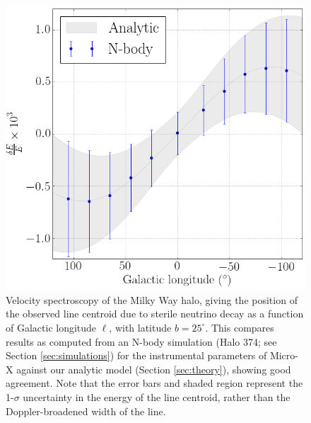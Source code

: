 \documentclass[aps,prl,10pt,twocolumn,superscriptaddress,showpacs]{revtex4-1}
\begin{document}
\begin{figure}[h!]
\centering
\includegraphics[width=1.0\columnwidth]{de_vs_l_filled.png}
\caption{Velocity spectroscopy of the Milky Way halo, giving the position of the observed line centroid due to sterile
	neutrino decay as a function of Galactic longitude $\ell$, with latitude $b=25^\circ$. This
	compares results as computed from an N-body simulation (Halo 374; see Section \ref{sec:simulations}) for the
	instrumental parameters of Micro-X against our analytic model (Section
	\ref{sec:theory}), showing good agreement.	
	Note that the error bars and shaded region represent the 1-$\sigma$ uncertainty
	in the energy of the line centroid, rather than the Doppler-broadened width of the line.}
\label{fig:de_vs_l}
\end{figure}

\end{document}
